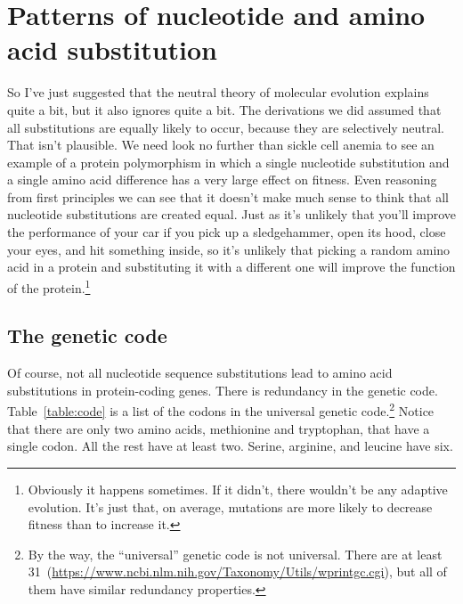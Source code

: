 \chapter{Patterns of nucleotide and amino acid substitution}

So I've just suggested that the neutral theory of molecular evolution
explains quite a bit, but it also ignores quite a bit. The derivations
we did assumed that all substitutions are equally likely to occur,
because they are selectively neutral. That isn't plausible. We need
look no further than sickle cell anemia to see an example of a protein
polymorphism in which a single nucleotide substitution and a single
amino acid difference has a very large effect on fitness. Even
reasoning from first principles we can see that it doesn't make much
sense to think that all nucleotide substitutions are created
equal. Just as it's unlikely that you'll improve the performance of
your car if you pick up a sledgehammer, open its hood, close your
eyes, and hit something inside, so it's unlikely that picking a random
amino acid in a protein and substituting it with a different one will
improve the function of the protein.\footnote{Obviously it happens
  sometimes. If it didn't, there wouldn't be any adaptive
  evolution. It's just that, on average, mutations are more likely to
  decrease fitness than to increase it. }

\section*{The genetic code}

Of course, not all nucleotide sequence substitutions lead to amino
acid substitutions in protein-coding genes. There is redundancy in the
genetic code. Table~\ref{table:code} is a list of the codons in the
universal genetic code.\footnote{By the way, the ``universal'' genetic
  code is not universal. There are at least
  31~(\url{https://www.ncbi.nlm.nih.gov/Taxonomy/Utils/wprintgc.cgi}),
  but all of them have similar redundancy properties.} Notice that
there are only two amino acids, methionine and tryptophan, that have a
single codon. All the rest have at least two. Serine, arginine, and
leucine have six.

